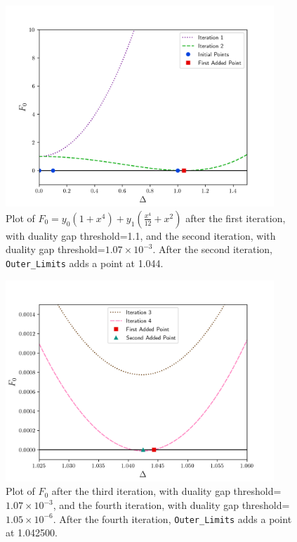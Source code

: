 \documentclass[12pt]{article}
\numberwithin{equation}{section}
\begin{document}
\pagebreak

\begin{figure}
\begin{center}
\includegraphics[width=0.9\textwidth]{outer_plots_1}
\end{center}
\caption{Plot of $F_{0}=y_{0}\left(1+x^4\right) + y_{1}\left(\frac{x^4}{12} + x^2\right)$
  after the first iteration, with duality gap threshold=1.1, and the second
  iteration, with duality gap threshold=$1.07\times10^{-3}$.  After the second
  iteration, \texttt{Outer\_Limits} adds a point at 1.044.}
\label{fig:plot1}
\end{figure}

\begin{figure}
\begin{center}
\includegraphics[width=0.9\textwidth]{outer_plots_2}
\end{center}
\caption{Plot of $F_{0}$
  after the third iteration, with duality gap threshold=$1.07\times10^{-3}$, and the fourth iteration, with duality gap threshold=$1.05\times10^{-6}$.  After the fourth
  iteration, \texttt{Outer\_Limits} adds a point at 1.042500.}
\label{fig:plot2}
\end{figure}
\end{document}
